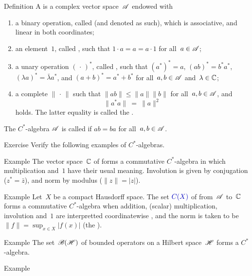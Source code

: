 \documentclass[main]{subfiles}
\begin{document}
\begin{parsec}%
\begin{point}{Definition}%
A 
is a complex vector space~$\mathscr{A}$
endowed with
\begin{enumerate}
\item
a binary operation,
called 
(and denoted as such),
which is associative, and linear in both coordinates;
\item
an element~$1$, called ,
such that $1\cdot a = a = a\cdot 1$
for all~$a\in \mathscr{A}$;
\item
a unary operation $(\,\cdot\,)^*$,
called ,
such that $(a^*)^*=a$,
$(ab)^*=b^*a^*$,
$(\lambda a)^* = \bar\lambda a^*$,
and $(a+b)^* = a^*+b^*$
for all~$a,b\in\mathscr{A}$ and~$\lambda\in \mathbb{C}$;
\item
a complete  $\|\,\cdot\,\|$
such that
$\|ab\|\leq\|a\|\|b\|$
for all~$a,b\in\mathscr{A}$,
and 
\begin{equation*}
\label{eq:Cstar-identity}
\|a^*a\|\ =\ \|a\|^2
\end{equation*}
holds. The latter equality is called the .
\end{enumerate}
The $C^*$-algebra $\mathscr{A}$ is called 
if $ab=ba$ for all~$a,b\in\mathscr{A}$.
\end{point}
\begin{point}{Exercise}%
Verify the following examples of $C^*$-algebras.
\begin{point}{Example}%
The vector space~$\mathbb{C}$ of 
forms a commutative  $C^*$-algebra
in which
multiplication and~$1$
have their usual meaning.
Involution is given by conjugation ($z^*=\bar{z}$),
and norm by modulus ($\|z\|=|z|$).
\end{point}
\begin{point}{Example}%
Let~$X$ be a compact Hausdorff space.
The set $\Define{C(X)}$ of 
from~$\mathscr{A}$ to~$\mathbb{C}$
forms a commutative $C^*$-algebra
when addition, (scalar) multiplication, involution and~$1$ are
interpretted coordinatewise ,
and the norm is taken to be 
$\|f\|=\sup_{x\in X} |f(x)|$
(the ).
\end{point}
\begin{point}{Example}%
The set~$\mathscr{B}(\mathscr{H})$ of bounded operators
on a Hilbert space~$\mathscr{H}$ forms a $C^*$-algebra.
\end{point}
\begin{point}{Example}%

\end{point}
\end{point}
\end{parsec}
\end{document}
